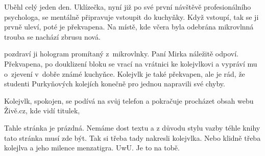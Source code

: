 \documentclass[a5paper, twoside,12pt]{book}
\begin{document}
Uběhl celý jeden den. Uklízečka, nyní již po své první návštěvě profesionálního psychologa, se mentálně připravuje vstoupit do kuchyňky. Když vstoupí, tak se ji prvně uleví, poté je překvapena. Na místě, kde včera byla odebrána mikrovlnná trouba se nachází zbrusu nová.

 pozdraví ji hologram promítaný z~mikrovlnky. Paní Mirka náležitě odpoví. Překvapena, po douklizení bloku se vrací na vrátnici ke kolejvlkovi a vypráví mu o~zjevení v~dobře známé kuchyňce. Kolejvlk je také překvapen, ale je rád, že studenti Purkyňových kolejích konečně pro jednou napravili své chyby.

Kolejvlk, spokojen, se podívá na svůj telefon a pokračuje procházet obsah webu Živě.cz, kde vidí titulek, 

\newpage

\begin{center}
    Tahle stránka je prázdná. Nemáme dost textu a z důvodu stylu vazby téhle knihy tato stránka musí zde být. Tak si třeba tady nakresli kolejvlka. Nebo klidně třeba kolejlva a jeho milence menzatigra. UwU. Je to na tobě. 
\end{center}
\end{document}
